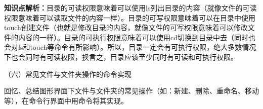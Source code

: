 \textbf{知识点解析：}目录的可读权限意味着可以使用ls列出目录的内容（就像文件的可读权限意味着可以读取文件的内容一样）。目录的可写权限意味着可以在目录中使用touch创建文件（也就是修改目录的内容，就像文件的可写权限意味着可以修改文件的内容的一样）。目录的可执行权限意味着可以使用cd切换到目录中去（同时也会对ls和touch等命令有所影响）。所以，目录一定会有可执行权限，绝大多数情况下也会同时有可读权限，换言之，目录应该至少同时有可读和可执行权限。


\vspace{0.1in}
（六）常见文件与文件夹操作的命令实现

回忆、总结图形界面下文件与文件夹的常见操作（如：新建、删除、重命名、移动等），在命令行界面中用命令将其实现。
